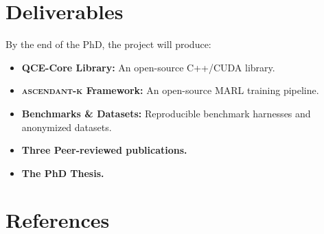 \documentclass[12pt,oneside]{report}
\newcommand{\framework}[1]{\textsc{#1}}
\newcommand{\ascendantk}{\framework{ascendant-k}}
\theoremstyle{definition}
\theoremstyle{plain}
\theoremstyle{remark}
\begin{document}
\chapter{Deliverables}
By the end of the PhD, the project will produce:
\begin{itemize}[itemsep=2pt, leftmargin=*]
  \item \textbf{QCE-Core Library:} An open-source C++/CUDA library.
  \item \textbf{\ascendantk{} Framework:} An open-source MARL training pipeline.
  \item \textbf{Benchmarks \& Datasets:} Reproducible benchmark harnesses and anonymized datasets.
  \item \textbf{Three Peer-reviewed publications.}
  \item \textbf{The PhD Thesis.}
\end{itemize}

\clearpage
\appendix
\chapter{References}
\printbibliography
\end{document}
